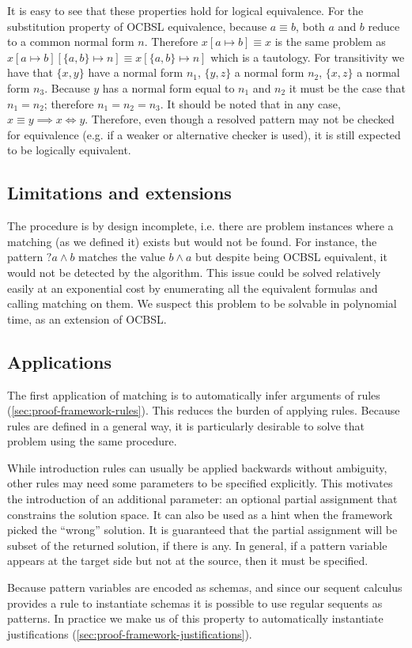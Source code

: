 It is easy to see that these properties hold for logical equivalence. For the substitution property of OCBSL equivalence, because $a \equiv b$, both $a$ and $b$ reduce to a common normal form $n$. Therefore $x[a \mapsto b] \equiv x$ is the same problem as $x[a \mapsto b][\{a, b\} \mapsto n] \equiv x[\{a, b\} \mapsto n]$ which is a tautology. For transitivity we have that $\{x, y\}$ have a normal form $n_1$, $\{y, z\}$ a normal form $n_2$, $\{x, z\}$ a normal form $n_3$. Because $y$ has a normal form equal to $n_1$ and $n_2$ it must be the case that $n_1 = n_2$; therefore $n_1 = n_2 = n_3$.
It should be noted that in any case, $x \equiv y \implies x \Leftrightarrow y$. Therefore, even though a resolved pattern may not be checked for equivalence (e.g. if a weaker or alternative checker is used), it is still expected to be logically equivalent.

\subsection{Limitations and extensions}

The procedure is by design incomplete, i.e. there are problem instances where a matching (as we defined it) exists but would not be found. For instance, the pattern ${?a} \land b$ matches the value $b \land a$ but despite being OCBSL equivalent, it would not be detected by the algorithm. This issue could be solved relatively easily at an exponential cost by enumerating all the equivalent formulas and calling matching on them. We suspect this problem to be solvable in polynomial time, as an extension of OCBSL.

\subsection{Applications}

The first application of matching is to automatically infer arguments of rules (\autoref{sec:proof-framework-rules}). This reduces the burden of applying rules. Because rules are defined in a general way, it is particularly desirable to solve that problem using the same procedure.

While introduction rules can usually be applied backwards without ambiguity, other rules may need some parameters to be specified explicitly. This motivates the introduction of an additional parameter: an optional partial assignment that constrains the solution space. It can also be used as a hint when the framework picked the ``wrong'' solution. It is guaranteed that the partial assignment will be subset of the returned solution, if there is any. In general, if a pattern variable appears at the target side but not at the source, then it must be specified.

Because pattern variables are encoded as schemas, and since our sequent calculus provides a rule to instantiate schemas it is possible to use regular sequents as patterns. In practice we make us of this property to automatically instantiate justifications (\autoref{sec:proof-framework-justifications}).

